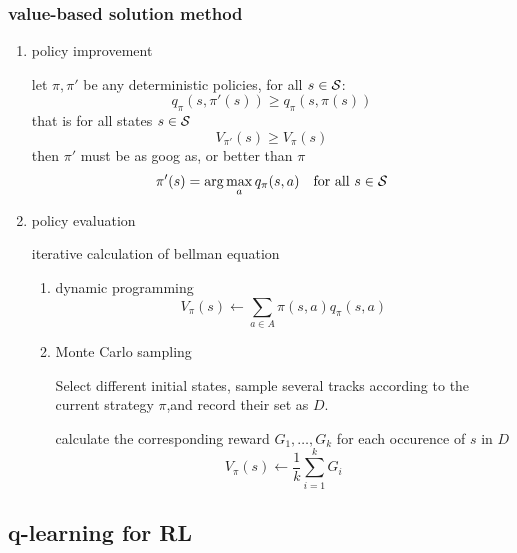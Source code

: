 \documentclass[11pt]{article}
\begin{document}
\subsubsection{value-based solution method}
\label{sec:orgc5840c9}
\begin{enumerate}
\item policy improvement

let \(\pi,\pi'\) be any deterministic policies, for all \(s\in\mathcal{S}\):
\begin{equation*}
q_\pi(s,\pi'(s))\ge q_\pi(s,\pi(s))
\end{equation*}
that is for all states \(s\in\mathcal{S}\)
\begin{equation*}
V_{\pi'}(s)\ge V_\pi(s)
\end{equation*}
then \(\pi'\) must be as goog as, or better than \(\pi\)
\begin{equation*}
\pi'(s)=\arg\max_aq_\pi(s,a)\quad \text{for all } s\in\mathcal{S}
\end{equation*}
\item policy evaluation

iterative calculation of bellman equation
\begin{enumerate}
\item dynamic programming
\begin{equation*}
V_\pi(s)\leftarrow \displaystyle\sum_{a\in A}\pi(s,a)q_\pi(s,a)
\end{equation*}
\item Monte Carlo sampling

Select different initial states, sample several tracks according to
the current strategy \(\pi\),and record their set as \(D\). 

calculate the corresponding reward \(G_1,\dots,G_k\) for each occurence
of \(s\) in \(D\)
\begin{equation*}
V_\pi(s)\leftarrow\frac{1}{k}\displaystyle\sum_{i=1}^kG_i
\end{equation*}
\end{enumerate}
\end{enumerate}
\subsection{q-learning for RL}
\label{sec:org5a5f4d5}
\end{document}
